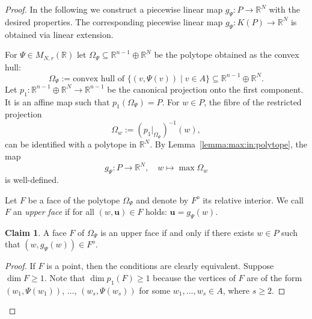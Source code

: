 \documentclass[12pt, a4article]{amsart}   	%
\numberwithin{equation}{section}
\theoremstyle{plain}
\theoremstyle{definition}
\newtheorem*{claim}{Claim}
\begin{document}
\begin{proof}
In the following we construct a piecewise linear map $g_\Psi:P\rightarrow \mathbb R^N$ with the desired properties. The corresponding piecewise linear map $g_\Psi:K(P)\rightarrow \mathbb R^N$ is obtained via linear extension.

For $\Psi\in M_{N,r}(\mathbb R)$ let $\Omega_\Psi\subseteq \mathbb R^{n-1}\oplus \mathbb R^N$ be the polytope obtained as the convex hull:
\begin{equation}\label{equation:Omega:Psi}
\Omega_\Psi:=\textrm{convex hull of\ }\{(  v,\Psi(  v))\mid   v\in A\}\subseteq \mathbb R^{n-1}\oplus \mathbb R^N.
\end{equation}
Let $p_1: \mathbb R^{n-1}\oplus \mathbb R^N\rightarrow \mathbb R^{n-1}$ be the canonical projection onto the first component. It is an affine map such that $p_1(\Omega_\Psi)=P$. For $w\in P$, the fibre of the restricted projection 
\begin{equation}\label{equation:fibre:Omega:w}
\Omega_{ {w}}:=(p_1\vert_{\Omega_\Psi})^{-1}(w) ,
\end{equation}
can be identified with a polytope in $\mathbb R^N$. By Lemma~\ref{lemma:max:in:polytope},  the map
\begin{equation}\label{definition:gPsi}
g_{\Psi}: P\rightarrow \mathbb R^N,\quad   w\mapsto \max \Omega_{ w}
\end{equation}
is well-defined.

Let $F$ be a face of the polytope $\Omega_\Psi$ and denote by $F^o$ its relative interior. We call $F$ an \emph{upper face} if for all $(w,\mathbf u)\in F$ holds: $\mathbf u=g_\Psi(  w)$. 

\begin{claim}
A face $F$ of $\Omega_\Psi$ is an upper face if and only if there exists $w\in P$ such that $(w,g_{\Psi}(w))\in F^o$.
\end{claim}

\begin{proof}
If $F$ is a point, then the conditions are clearly equivalent. Suppose $\dim F\ge 1$. Note that $\dim p_1(F)\ge 1$ because the vertices of $F$ are of the form $(w_1,\Psi(w_1))$, $\ldots$, $(w_s,\Psi(w_s))$ for some $w_1,\ldots, w_s\in A$, where $s\ge 2$.


\end{proof}
\end{proof}
\end{document}
